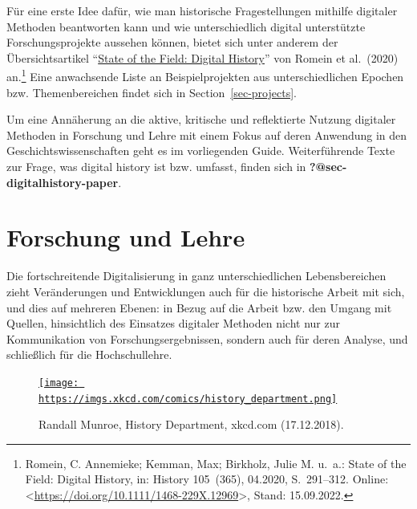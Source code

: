 \documentclass[
  letterpaper,
]{book}
\begin{document}
Für eine erste Idee dafür, wie man historische Fragestellungen mithilfe
digitaler Methoden beantworten kann und wie unterschiedlich digital
unterstützte Forschungsprojekte aussehen können, bietet sich unter
anderem der Übersichtsartikel
``\href{https://onlinelibrary.wiley.com/doi/10.1111/1468-229X.12969}{State
of the Field: Digital History}'' von Romein et al.~(2020) an.\footnote{Romein,
  C. Annemieke; Kemman, Max; Birkholz, Julie M. u.~a.: State of the
  {Field}: {Digital} {History}, in: History 105~(365), 04.2020,
  S.~291--312. Online:
  \textless{}\url{https://doi.org/10.1111/1468-229X.12969}\textgreater,
  Stand: 15.09.2022.} Eine anwachsende Liste an Beispielprojekten aus
unterschiedlichen Epochen bzw. Themenbereichen findet sich in
Section~\ref{sec-projects}.

Um eine Annäherung an die aktive, kritische und reflektierte Nutzung
digitaler Methoden in Forschung und Lehre mit einem Fokus auf deren
Anwendung in den Geschichtswissenschaften geht es im vorliegenden Guide.
Weiterführende Texte zur Frage, was digital history ist bzw. umfasst,
finden sich in \textbf{?@sec-digitalhistory-paper}.


\hypertarget{forschung-und-lehre}{%
\chapter{Forschung und Lehre}\label{forschung-und-lehre}}

Die fortschreitende Digitalisierung in ganz unterschiedlichen
Lebensbereichen zieht Veränderungen und Entwicklungen auch für die
historische Arbeit mit sich, und dies auf mehreren Ebenen: in Bezug auf
die Arbeit bzw. den Umgang mit Quellen, hinsichtlich des Einsatzes
digitaler Methoden nicht nur zur Kommunikation von
Forschungsergebnissen, sondern auch für deren Analyse, und schließlich
für die Hochschullehre.

\begin{figure}

\href{history_department}{\texttt{[image: https://imgs.xkcd.com/comics/history\_department.png]}}

\caption{Randall Munroe, History Department, xkcd.com (17.12.2018).}

\end{figure}
\end{document}
